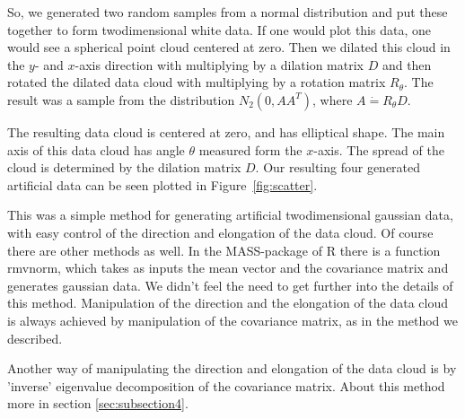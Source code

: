 \documentclass{article}
\begin{document}
So, we generated two random samples from a normal distribution and put these
together to form twodimensional white data. If one would plot this
data, one would see a spherical point cloud centered at zero. Then we
dilated this cloud in the $y$- and $x$-axis direction with multiplying by a dilation matrix $D$ and then rotated
the dilated data cloud with multiplying by a rotation matrix
$R_\theta$. The result was a sample from the 
distribution $N_2(0,AA^T)$, where $A \dot{=} R_\theta D$.

The resulting data cloud is centered at zero, and has elliptical
shape. The main axis of this data cloud has angle $\theta$ measured
form the $x$-axis. The spread of the cloud is determined by the
dilation matrix $D$. Our resulting four generated artificial data can be
seen plotted in Figure~\ref{fig:scatter}. 

This was a simple method for generating artificial twodimensional
gaussian data, with easy control of the direction and elongation of
the data cloud. Of course there are other methods as well. In the
MASS-package of R there is a function rmvnorm, which takes as
inputs the mean vector and the covariance matrix and generates
gaussian data. We
didn't feel the need to get further into the details of this
method. Manipulation of the direction and the elongation of the data
cloud is always achieved by manipulation of the covariance matrix, as
in the method we described.

Another way of manipulating the direction and elongation of the data
cloud is by 'inverse' eigenvalue decomposition of the covariance
matrix. About this method more in section \ref{sec:subsection4}.
\end{document}
